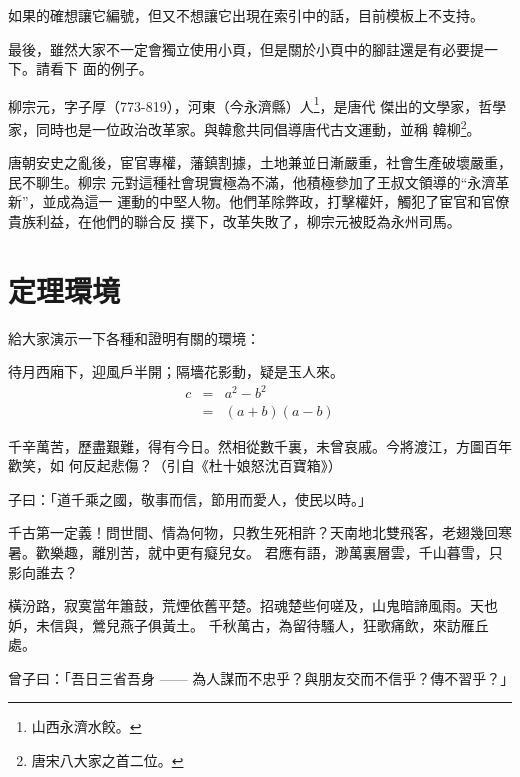 如果的確想讓它編號，但又不想讓它出現在索引中的話，目前模板上不支持。

最後，雖然大家不一定會獨立使用小頁，但是關於小頁中的腳註還是有必要提一下。請看下
面的例子。

\begin{minipage}[t]{\linewidth-2\parindent}
  柳宗元，字子厚（773-819），河東（今永濟縣）人\footnote{山西永濟水餃。}，是唐代
  傑出的文學家，哲學家，同時也是一位政治改革家。與韓愈共同倡導唐代古文運動，並稱
  韓柳\footnote{唐宋八大家之首二位。}。
\end{minipage}

唐朝安史之亂後，宦官專權，藩鎮割據，土地兼並日漸嚴重，社會生產破壞嚴重，民不聊生。柳宗
元對這種社會現實極為不滿，他積極參加了王叔文領導的“永濟革新”，並成為這一
運動的中堅人物。他們革除弊政，打擊權奸，觸犯了宦官和官僚貴族利益，在他們的聯合反
撲下，改革失敗了，柳宗元被貶為永州司馬。

\section{定理環境}
\label{sec:theorem}

給大家演示一下各種和證明有關的環境：

\begin{assumption}
待月西廂下，迎風戶半開；隔墻花影動，疑是玉人來。
\begin{eqnarray}
  \label{eq:eqnxmp}
  c & = & a^2 - b^2\\
    & = & (a+b)(a-b)
\end{eqnarray}
\end{assumption}

千辛萬苦，歷盡艱難，得有今日。然相從數千裏，未曾哀戚。今將渡江，方圖百年歡笑，如
何反起悲傷？（引自《杜十娘怒沈百寶箱》）

\begin{definition}
子曰：「道千乘之國，敬事而信，節用而愛人，使民以時。」
\end{definition}

千古第一定義！問世間、情為何物，只教生死相許？天南地北雙飛客，老翅幾回寒暑。歡樂趣，離別苦，就中更有癡兒女。
君應有語，渺萬裏層雲，千山暮雪，只影向誰去？

橫汾路，寂寞當年簫鼓，荒煙依舊平楚。招魂楚些何嗟及，山鬼暗諦風雨。天也妒，未信與，鶯兒燕子俱黃土。
千秋萬古，為留待騷人，狂歌痛飲，來訪雁丘處。

\begin{proposition}
 曾子曰：「吾日三省吾身 —— 為人謀而不忠乎？與朋友交而不信乎？傳不習乎？」
\end{proposition}


